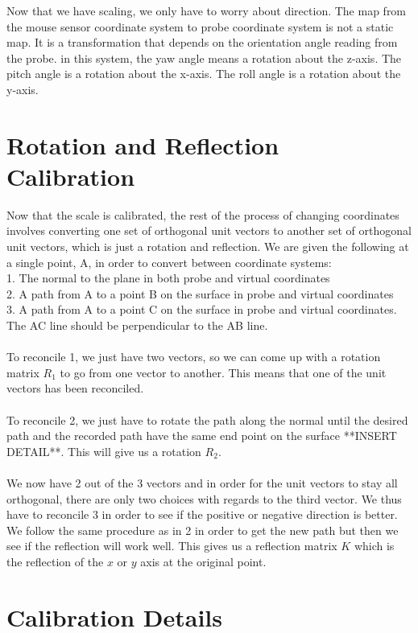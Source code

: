 \documentclass[11pt,psfig]{article}
\begin{document}
Now that we have scaling, we only have to worry about direction. The map from the mouse sensor coordinate system to probe coordinate system is not a static map. It is a transformation that depends on the orientation angle reading from the probe. in this system, the yaw angle means a rotation about the z-axis. The pitch angle is a rotation about the x-axis. The roll angle is a rotation about the y-axis.

\section*{Rotation and Reflection Calibration}

Now that the scale is calibrated, the rest of the process of changing coordinates involves converting one set of orthogonal unit vectors to another set of orthogonal unit vectors, which is just a rotation and reflection. We are given the following at a single point, A, in order to convert between coordinate systems:\\
1. The normal to the plane in both probe and virtual coordinates\\
2. A path from A to a point B on the surface in probe and virtual coordinates\\
3. A path from A to a point C on the surface in probe and virtual coordinates. The AC line should be perpendicular to the AB line. \\
\\
To reconcile 1, we just have two vectors, so we can come up with a rotation matrix $R_1$ to go from one vector to another. This means that one of the unit vectors has been reconciled. \\
\\
To reconcile 2, we just have to rotate the path along the normal until the desired path and the recorded path have the same end point on the surface **INSERT DETAIL**. This will give us a rotation $R_2$. \\
\\
We now have 2 out of the 3 vectors and in order for the unit vectors to stay all orthogonal, there are only two choices with regards to the third vector. We thus have to reconcile 3 in order to see if the positive or negative direction is better. We follow the same procedure as in 2 in order to get the new path but then we see if the reflection will work well. This gives us a reflection matrix $K$ which is the reflection of the $x$ or $y$ axis at the original point.

\section*{Calibration Details}
\end{document}
